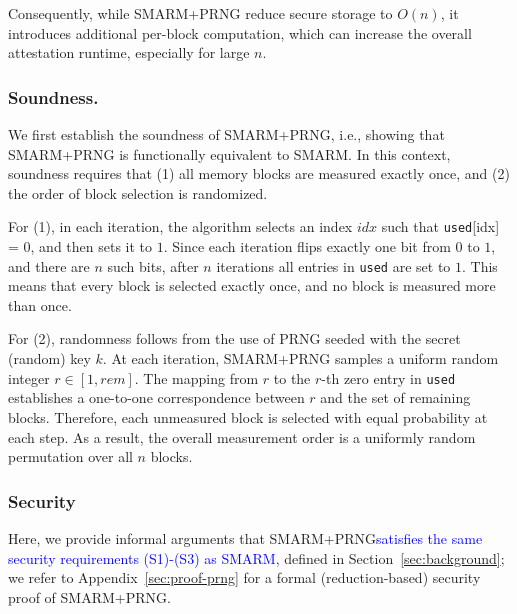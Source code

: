 \documentclass[journal]{IEEEtran}
\newcommand\ben[1]{\textcolor{blue}{#1}}
\newcommand{\rtsmarmone}{SMARM+PRNG\xspace}
\begin{document}
Consequently, while \rtsmarmone reduce secure storage to $O(n)$, it introduces additional per-block computation, which can increase the overall attestation runtime, especially for large $n$.



\subsubsection{Soundness.}\label{subsubsec:v1-sound}
We first establish the soundness of \rtsmarmone, i.e., showing that \rtsmarmone is functionally equivalent to SMARM.
In this context, soundness requires that (1) all memory blocks are measured exactly once, and (2) the order of block selection is randomized.

For (1), in each iteration, the algorithm selects an index $idx$ such that \texttt{used}[idx] = 0, and then sets it to $1$.
Since each iteration flips exactly one bit from $0$ to $1$, and there are $n$ such bits, after $n$ iterations all entries in \texttt{used} are set to $1$.
This means that every block is selected exactly once, and no block is measured more than once.

For (2), randomness follows from the use of PRNG seeded with the secret (random) key $k$.
At each iteration, \rtsmarmone samples a uniform random integer $r \in [1, rem]$.
The mapping from $r$ to the $r$-th zero entry in \texttt{used} establishes a one-to-one correspondence between $r$ and the set of remaining blocks.
Therefore, each unmeasured block is selected with equal probability at each step.
As a result, the overall measurement order is a uniformly random permutation over all $n$ blocks.

\subsubsection{Security}
Here, we provide informal arguments that \rtsmarmone \ben{satisfies the same security requirements (S1)-(S3) as SMARM,} defined in Section~\ref{sec:background}; we refer to Appendix~\ref{sec:proof-prng} for a formal (reduction-based) security proof of \rtsmarmone.
\end{document}
